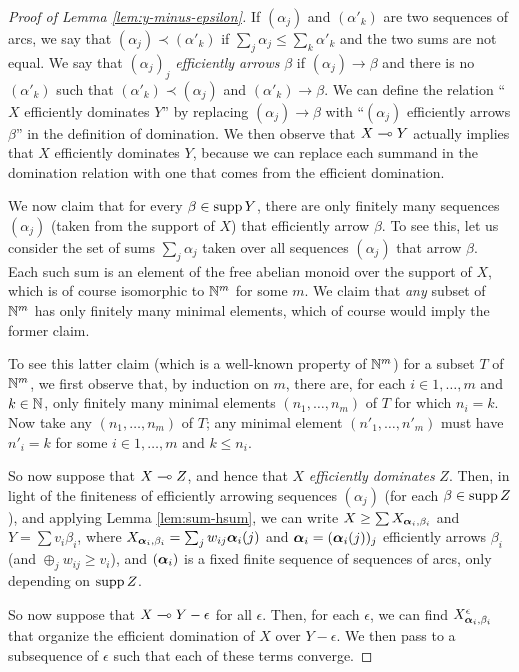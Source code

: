 \begin{proof}[Proof of Lemma \ref{lem:y-minus-epsilon}]
If $(\alpha_j)$ and $(\alpha'_k)$ are two sequences of arcs, 
we say that $(\alpha_j) \prec (\alpha'_k)$ if $\sum_j \alpha_j \le \sum_k \alpha'_k$ and the two sums are not equal.
We say that $(\alpha_j)_j$ \emph{efficiently arrows} $\beta$ if $(\alpha_j) \to \beta$ and there is no $(\alpha'_k)$ such that $(\alpha'_k) \prec (\alpha_j)$ and $(\alpha'_k) \to \beta$.
We can define the relation ``$X$ efficiently dominates $Y$'' by replacing $(\alpha_j) \to \beta$ with ``$(\alpha_j)$ efficiently arrows $\beta$'' in the definition of domination. 
We then observe that $X \multimap Y$ actually implies that $X$ efficiently dominates $Y$,
because we can replace each summand in the domination relation with one that comes from the efficient domination. 

We now claim that for every $\beta \in \operatorname{supp} Y$, 
there are only finitely many sequences $(\alpha_j)$ (taken from the support of $X$) that efficiently arrow $\beta$.
To see this, let us consider the set of sums $\sum_j \alpha_j$ taken over all sequences $(\alpha_j)$ that arrow $\beta$.
Each such sum is an element of the free abelian monoid over the support of $X$, which is of course isomorphic to ${\Bbb N}^m$ for some $m$. 
We claim that \emph{any} subset of ${\Bbb N}^m$ has only finitely many minimal elements, which of course would imply the former claim.

To see this latter claim (which is a well-known property of ${\Bbb N}^m$) for a subset $T$ of ${\Bbb N}^m$,
we first observe that,
by induction on $m$,
there are,
for each $i \in 1,\ldots, m$ and $k \in {\Bbb N}$,
only finitely many minimal elements $(n_1, \ldots, n_m)$ of $T$ for which $n_i =k$.
Now take any $(n_1, \ldots, n_m)$ of $T$;
any minimal element $(n'_1, \ldots, n'_m)$ must have $n'_i = k$ for some $i \in 1, \ldots, m$ and $k \le n_i$. 

So now suppose that $X \multimap Z$, and hence that $X$ \emph{efficiently dominates} $Z$.
Then, in light of the finiteness of efficiently arrowing sequences $(\alpha_j)$ (for each $\beta \in \operatorname{supp} Z$),
and applying Lemma \ref{lem:sum-hsum},
we can write $X \ge \sum X_{\boldsymbol{\alpha}_i, \beta_i}$ and $Y = \sum v_i \beta_i$,
where $X_{\boldsymbol{\alpha}_i, \beta_i} = \sum_j w_{ij} \boldsymbol{\alpha}_i(j)$ and $\boldsymbol{\alpha}_i = (\boldsymbol{\alpha}_i(j))_j$ efficiently arrows $\beta_i$ (and $\oplus_j w_{ij} \ge v_i$),
and  $(\boldsymbol{\alpha}_i)$ is a fixed finite sequence of sequences of arcs, only depending on $\operatorname{supp} Z$.

So now suppose that $X \multimap Y -\epsilon$ for all $\epsilon$.
Then, for each $\epsilon$, we can find $X^\epsilon_{\boldsymbol{\alpha}_i, \beta_i}$ that organize the efficient domination of $X$ over $Y - \epsilon$.
We then pass to a subsequence of $\epsilon$ such that each of these terms converge. 
\end{proof}


